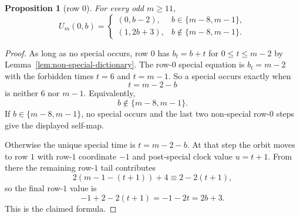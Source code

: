 \documentclass[11pt]{article}
\newtheorem{proposition}[theorem]{Proposition}
\newcommand{\1}{\mathbf 1}
\begin{document}
\begin{proposition}[row $0$]\label{prop:row0}
For every odd $m\ge 11$,
\[
U_m(0,b)=
\begin{cases}
(0,b-2), & b\in\{m-8,m-1\},\\
(1,2b+3), & b\notin\{m-8,m-1\}.
\end{cases}
\]
\end{proposition}

\begin{proof}
As long as no special occurs, row $0$ has $b_t=b+t$ for $0\le t\le m-2$ by
Lemma~\ref{lem:non-special-dictionary}. The row-$0$ special equation is
$b_t=m-2$ with the forbidden times $t=6$ and $t=m-1$. So a special occurs
exactly when
\[
t=m-2-b
\]
is neither $6$ nor $m-1$. Equivalently,
\[
b\notin\{m-8,m-1\}.
\]
If $b\in\{m-8,m-1\}$, no special occurs and the last two non-special row-$0$
steps give the displayed self-map.

Otherwise the unique special time is $t=m-2-b$. At that step the orbit moves to
row $1$ with row-$1$ coordinate $-1$ and post-special clock value $u=t+1$.
From there the remaining row-$1$ tail contributes
\[
2(m-1-(t+1))+4 \equiv 2-2(t+1),
\]
so the final row-$1$ value is
\[
-1 + 2 - 2(t+1) = -1-2t = 2b+3.
\]
This is the claimed formula.
\end{proof}
\end{document}
